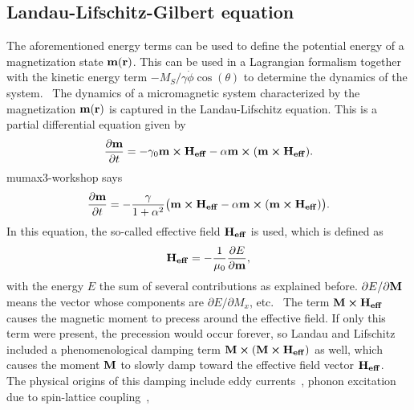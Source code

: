 \documentclass[10pt,a4paper]{article}
\begin{document}
\subsection{Landau-Lifschitz-Gilbert equation}
The aforementioned energy terms can be used to define the potential energy of a magnetization state $\vb{m}(\vb{r})$. This can be used in a Lagrangian formalism together with the kinetic energy term $-M_S/\gamma \dot{\phi} \cos(\theta)$ to determine the dynamics of the system.~\cite{abert2013discrete} 
The dynamics of a micromagnetic system characterized by the magnetization $\vb{m}(\vb{r})$ is captured in the Landau-Lifschitz equation. This is a partial differential equation given by~\cite{phd_leliaert}
\begin{equation}
	\frac{\partial \vb{m}}{\partial t} = - \gamma_0 \vb{m} \cross \vb{H_{eff}} - \alpha \vb{m} \cross (\vb{m} \cross \vb{H_{eff}}) \mathrm{.}
	\label{eq:LL}
\end{equation}
mumax3-workshop says
\begin{equation}
	\frac{\partial \vb{m}}{\partial t} = - \frac{\gamma}{1+\alpha^2} \big( \vb{m} \cross \vb{H_{eff}} - \alpha \vb{m} \cross (\vb{m} \cross \vb{H_{eff}}) \big) \mathrm{.}
\end{equation}
In this equation, the so-called effective field $\vb{H_{eff}}$ is used, which is defined as
\begin{equation}
	\vb{H_{eff}} = - \frac{1}{\mu_0} \frac{\partial E}{\partial \vb{m}} \mathrm{,}
	\label{eq:H_eff}
\end{equation}
with the energy $E$ the sum of several contributions as explained before. $\partial E/\partial \vb{M}$ means the vector whose components are $\partial E/\partial M_x$, etc.~\cite{ThermFluc_SingleDomain}
The term $\vb{M} \cross \vb{H_{eff}}$ causes the magnetic moment to precess around the effective field. If only this term were present, the precession would occur forever, so Landau and Lifschitz included a phenomenological damping term $\vb{M} \cross (\vb{M} \cross \vb{H_{eff}})$ as well, which causes the moment $\vb{M}$ to slowly damp toward the effective field vector $\vb{H_{eff}}$.~\cite{NML_Carlton} The physical origins of this damping include eddy currents~\cite{phd_leliaert}, phonon excitation due to spin-lattice coupling~\cite{phd_leliaert}, %
\end{document}
